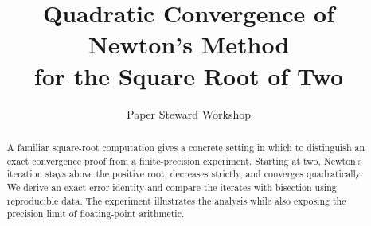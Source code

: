 \documentclass[11pt]{article}
\title{Quadratic Convergence of Newton's Method\\for the Square Root of Two}
\author{Paper Steward Workshop}
\date{}
\begin{document}
\maketitle
\begin{abstract}
A familiar square-root computation gives a concrete setting in which to distinguish
an exact convergence proof from a finite-precision experiment. Starting at two,
Newton's iteration stays above the positive root, decreases strictly, and converges
quadratically. We derive an exact error identity and compare the iterates with
bisection using reproducible data. The experiment illustrates the analysis while
also exposing the precision limit of floating-point arithmetic.
\end{abstract}








\end{document}
